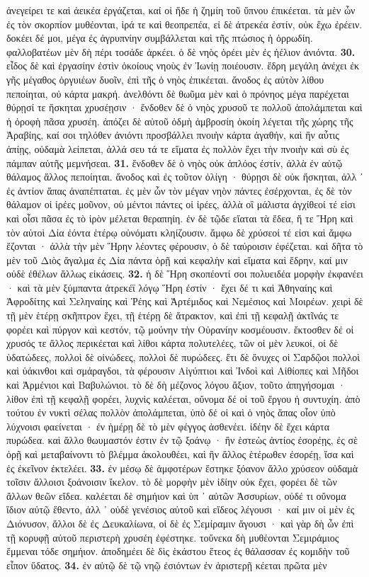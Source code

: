 \documentclass[a4paper, 11pt, oneside, polutonikogreek, german]{article}
\begin{document}
ἀνεγείρει τε καὶ ἀεικέα ἐργάζεται, καί οἱ ἥδε ἡ ζημίη τοῦ ὕπνου ἐπικέεται. τὰ μὲν ὦν ἐς τὸν σκορπίον μυθέονται, ἱρά τε καὶ θεοπρεπέα, εἰ δὲ ἀτρεκέα ἐστίν, οὐκ ἔχω ἐρέειν. δοκέει δέ μοι, μέγα ἐς ἀγρυπνίην συμβάλλεται καὶ τῆς πτώσιος ἡ ὀρρωδίη. φαλλοβατέων μὲν δὴ πέρι τοσάδε ἀρκέει. ὁ δὲ νηὸς ὁρέει μὲν ἐς ἠέλιον ἀνιόντα. \textbf{30.} εἶδος δὲ καὶ ἐργασίην ἐστὶν ὁκοίους νηοὺς ἐν Ἰωνίῃ ποιέουσιν. ἕδρη μεγάλη ἀνέχει ἐκ γῆς μέγαθος ὀργυιέων δυοῖν, ἐπὶ τῆς ὁ νηὸς ἐπικέεται. ἄνοδος ἐς αὐτὸν λίθου πεποίηται, οὐ κάρτα μακρή. ἀνελθόντι δὲ θωῦμα μὲν καὶ ὁ πρόνηος μέγα παρέχεται θύρῃσί τε ἤσκηται χρυσέῃσιν · ἔνδοθεν δὲ ὁ νηὸς χρυσοῦ τε πολλοῦ ἀπολάμπεται καὶ ἡ ὀροφὴ πᾶσα χρυσέη. ἀπόζει δὲ αὐτοῦ ὀδμὴ ἀμβροσίη ὁκοίη λέγεται τῆς χώρης τῆς Ἀραβίης, καί σοι τηλόθεν ἀνιόντι προσβάλλει πνοιὴν κάρτα ἀγαθήν, καὶ ἢν αὖτις ἀπίῃς, οὐδαμὰ λείπεται, ἀλλά σευ τά τε εἵματα ἐς πολλὸν ἔχει τὴν πνοιὴν καὶ σὺ ἐς πάμπαν αὐτῆς μεμνήσεαι. \textbf{31.} ἔνδοθεν δὲ ὁ νηὸς οὐκ ἁπλόος ἐστίν, ἀλλὰ ἐν αὐτῷ θάλαμος ἄλλος πεποίηται. ἄνοδος καὶ ἐς τοῦτον ὀλίγη · θύρῃσι δὲ οὐκ ἤσκηται, ἀλλ ᾽ ἐς ἀντίον ἅπας ἀναπέπταται. ἐς μὲν ὦν τὸν μέγαν νηὸν πάντες ἐσέρχονται, ἐς δὲ τὸν θάλαμον οἱ ἱρέες μοῦνον, οὐ μέντοι πάντες οἱ ἱρέες, ἀλλὰ οἳ μάλιστα ἀγχίθεοί τέ εἰσι καὶ οἷσι πᾶσα ἐς τὸ ἱρὸν μέλεται θεραπηίη. ἐν δὲ τῷδε εἵαται τὰ ἕδεα, ἥ τε Ἥρη καὶ τὸν αὐτοὶ Δία ἐόντα ἑτέρῳ οὐνόματι κληίζουσιν. ἄμφω δὲ χρύσεοί τέ εἰσι καὶ ἄμφω ἕζονται · ἀλλὰ τὴν μὲν Ἥρην λέοντες φέρουσιν, ὁ δὲ ταύροισιν ἐφέζεται. καὶ δῆτα τὸ μὲν τοῦ Διὸς ἄγαλμα ἐς Δία πάντα ὁρῇ καὶ κεφαλὴν καὶ εἵματα καὶ ἕδρην, καί μιν οὐδὲ ἐθέλων ἄλλως εἰκάσεις. \textbf{32.} ἡ δὲ Ἥρη σκοπέοντί σοι πολυειδέα μορφὴν ἐκφανέει · καὶ τὰ μὲν ξύμπαντα ἀτρεκέϊ λόγῳ Ἥρη ἐστίν · ἔχει δέ τι καὶ Ἀθηναίης καὶ Ἀφροδίτης καὶ Σεληναίης καὶ Ῥέης καὶ Ἀρτέμιδος καὶ Νεμέσιος καὶ Μοιρέων. χειρὶ δὲ τῇ μὲν ἑτέρῃ σκῆπτρον ἔχει, τῇ ἑτέρῃ δὲ ἄτρακτον, καὶ ἐπὶ τῇ κεφαλῇ ἀκτῖνάς τε φορέει καὶ πύργον καὶ κεστόν, τῷ μούνην τὴν Οὐρανίην κοσμέουσιν. ἔκτοσθεν δέ οἱ χρυσός τε ἄλλος περικέεται καὶ λίθοι κάρτα πολυτελέες, τῶν οἱ μὲν λευκοί, οἱ δὲ ὑδατώδεες, πολλοὶ δὲ οἰνώδεες, πολλοὶ δὲ πυρώδεες. ἔτι δὲ ὄνυχες οἱ Σαρδῷοι πολλοὶ καὶ ὑάκινθοι καὶ σμάραγδοι, τὰ φέρουσιν Αἰγύπτιοι καὶ Ἰνδοὶ καὶ Αἰθίοπες καὶ Μῆδοι καὶ Ἀρμένιοι καὶ Βαβυλώνιοι. τὸ δὲ δὴ μέζονος λόγου ἄξιον, τοῦτο ἀπηγήσομαι · λίθον ἐπὶ τῇ κεφαλῇ φορέει, λυχνὶς καλέεται, οὔνομα δέ οἱ τοῦ ἔργου ἡ συντυχίη. ἀπὸ τούτου ἐν νυκτὶ σέλας πολλὸν ἀπολάμπεται, ὑπὸ δέ οἱ καὶ ὁ νηὸς ἅπας οἷον ὑπὸ λύχνοισι φαείνεται · ἐν ἡμέρῃ δὲ τὸ μὲν φέγγος ἀσθενέει. ἰδέην δὲ ἔχει κάρτα πυρώδεα. καὶ ἄλλο θωυμαστόν ἐστιν ἐν τῷ ξοάνῳ · ἢν ἑστεὼς ἀντίος ἐσορέῃς, ἐς σὲ ὁρῇ καὶ μεταβαίνοντι τὸ βλέμμα ἀκολουθέει, καὶ ἢν ἄλλος ἑτέρωθεν ἐσορέῃ, ἴσα καὶ ἐς ἐκεῖνον ἐκτελέει. \textbf{33.} ἐν μέσῳ δὲ ἀμφοτέρων ἕστηκε ξόανον ἄλλο χρύσεον οὐδαμὰ τοῖσιν ἄλλοισι ξοάνοισιν ἴκελον. τὸ δὲ μορφὴν μὲν ἰδίην οὐκ ἔχει, φορέει δὲ τῶν ἄλλων θεῶν εἴδεα. καλέεται δὲ σημήιον καὶ ὑπ ᾽ αὐτῶν Ἀσσυρίων, οὐδέ τι οὔνομα ἴδιον αὐτῷ ἔθεντο, ἀλλ ᾽ οὐδὲ γενέσιος αὐτοῦ καὶ εἴδεος λέγουσι · καί μιν οἱ μὲν ἐς Διόνυσον, ἄλλοι δὲ ἐς Δευκαλίωνα, οἱ δὲ ἐς Σεμίραμιν ἄγουσι · καὶ γὰρ δὴ ὦν ἐπὶ τῇ κορυφῇ αὐτοῦ περιστερὴ χρυσέη ἐφέστηκε. τοὔνεκα δὴ μυθέονται Σεμιράμιος ἔμμεναι τόδε σημήιον. ἀποδημέει δὲ δὶς ἑκάστου ἔτεος ἐς θάλασσαν ἐς κομιδὴν τοῦ εἶπον ὕδατος. \textbf{34.} ἐν αὐτῷ δὲ τῷ νηῷ ἐσιόντων ἐν ἀριστερῇ κέεται πρῶτα μὲν 
\end{document}
